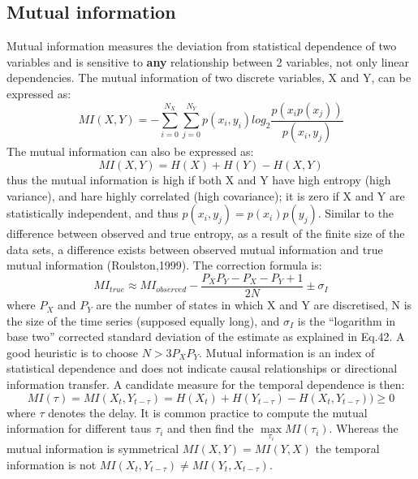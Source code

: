 \subsection{Mutual information}
Mutual information measures the deviation from statistical dependence of two
variables and is sensitive to \textbf{any} relationship between 2 variables,
not only linear dependencies.
The mutual information of two discrete variables, X and Y, can be expressed as:
\begin{equation}
MI(X,Y)=-\sum_{i=0}^{N_{X}} \sum_{j=0}^{N_{Y}} p(x_{i},y_{i}) log_2 \frac {p(x_{i}p(x_{j}))}{p(x_{i},y_{j})}
\end{equation}
The mutual information can also be expressed as:
\begin{equation}
MI(X,Y)=H(X)+H(Y)-H(X,Y)
\end{equation}
thus the mutual information is high if both X and Y have high entropy (high variance),
and hare highly correlated (high covariance); it is zero if X and Y are statistically independent,
and thus $p(x_i,y_j)=p(x_i)p(y_j)$.
Similar to the difference between observed and true entropy, as a result of the
finite size of the data sets, a difference exists between observed mutual information
and true mutual information (Roulston,1999).
The correction formula is:
\begin{equation}
MI_{true}\approx MI_{observed} - \frac{P_{X}P_{Y}-P_{X}-P_{Y}+1}{2 N} \pm \sigma_{I}
\end{equation}
where $P_{X}$ and $P_{Y}$ are the number of states in which X and Y are discretised,
N is the size of the time series (supposed equally long), and $\sigma_{I}$ is the
``logarithm in base two'' corrected standard deviation of the estimate
as explained in \citep{Roulston1999:Estimation} Eq.42.
A good heuristic is to choose $N>3 P_{X} P_{Y}$.
Mutual information is an index of statistical dependence and does not indicate causal
relationships or directional information transfer.
A candidate measure for the temporal dependence is then:
\begin{equation}
MI(\tau)=MI(X_{t},Y_{t-\tau})=H(X_{t})+H(Y_{t-\tau})-H(X_{t},Y_{t-\tau})) \geqslant 0
\end{equation}
where $\tau$ denotes the delay. It is common practice to compute the mutual
information for different taus $\tau_{i}$ and then find the $\max\limits_{\tau_i} MI(\tau_i)$.
Whereas the mutual information is symmetrical $MI(X,Y)=MI(Y,X)$ the temporal
information is not $MI(X_{t},Y_{t-\tau}) \neq MI(Y_{t},X_{t-\tau})$.

